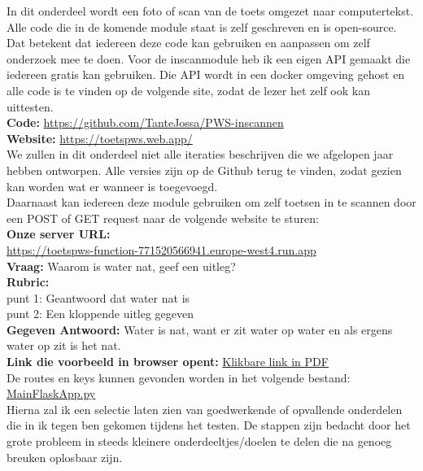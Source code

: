 \documentclass[12pt]{article}
\begin{document}
\begin{multicols}{2}
In dit onderdeel wordt een foto of scan van de toets omgezet naar computertekst. Alle code die in de komende module staat is zelf geschreven en is open-source. Dat betekent dat iedereen deze code kan gebruiken en aanpassen om zelf onderzoek mee te doen. Voor de inscanmodule heb ik een eigen API gemaakt die iedereen gratis kan gebruiken. Die API wordt in een docker omgeving gehost en alle code is te vinden op de volgende site, zodat de lezer het zelf ook kan uittesten. \\
\textbf{Code: }\url{https://github.com/TanteJossa/PWS-inscannen}\\
\textbf{Website: }\url{https://toetspws.web.app/}
\\
We zullen in dit onderdeel niet alle iteraties beschrijven die we afgelopen jaar hebben ontworpen. Alle versies zijn op de Github terug te vinden, zodat gezien kan worden wat er wanneer is toegevoegd. 
\\
Daarnaast kan iedereen deze module gebruiken om zelf toetsen in te scannen door een POST of GET request naar de volgende website te sturen: \\
\textbf{Onze server URL:} \\ \url{https://toetspws-function-771520566941.europe-west4.run.app}\\
\textbf{Vraag:} Waarom is water nat, geef een uitleg?\\
\textbf{Rubric:}\\
punt 1: Geantwoord dat water nat is\\
punt 2: Een kloppende uitleg gegeven
\\
\textbf{Gegeven Antwoord:} Water is nat, want er zit water op water en als ergens water op zit is het nat.\\
\textbf{Link die voorbeeld in browser opent:} \href{https://toetspws-function-771520566941.europe-west4.run.app/grade?rubric=punt%201%3A%20Geantwoord%20dat%20water%20nat%20is%0Apunt%202%3A%20Een%20kloppende%20uitleg%20gegeven&question=Waarom%20is%20water%20nat%2C%20geef%20een%20uitleg%3F&answer=Water%20is%20nat%2C%20want%20er%20zit%20water%20op%20water%20en%20als%20ergens%20water%20op%20zit%20is%20het%20nat}{Klikbare link in PDF}\\
De routes en keys kunnen gevonden worden in het volgende bestand: \\
\href{https://github.com/TanteJossa/PWS-inscannen/blob/main/section_scanner/app/main.py}{MainFlaskApp.py}\\
Hierna zal ik een selectie laten zien van goedwerkende of opvallende onderdelen die in ik tegen ben gekomen tijdens het testen. De stappen zijn bedacht door het grote probleem in steeds kleinere onderdeeltjes/doelen te delen die na genoeg breuken oplosbaar zijn. 
\end{multicols}
\end{document}
